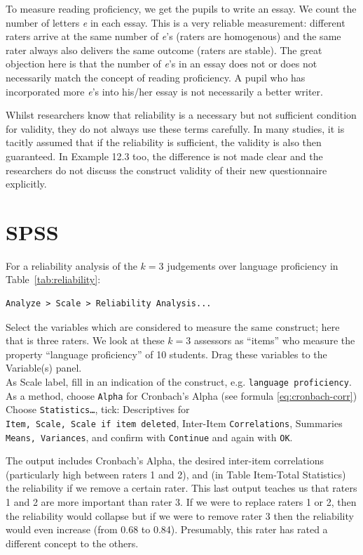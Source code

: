 \documentclass[
]{book}
\begin{document}
To measure reading proficiency, we get the pupils to write
an essay. We count the number of letters \emph{e} in each essay. This is
a very reliable measurement: different raters arrive at the same
number of \emph{e}'s (raters are homogenous) and the same rater always also
delivers the same outcome (raters are stable). The great objection here is that
the number of \emph{e}'s in an essay does not or does not necessarily match the concept
of reading proficiency. A pupil who has incorporated more \emph{e}'s into his/her essay
is not necessarily a better writer.

Whilst researchers know that reliability is a necessary but not
sufficient condition for validity, they do not always use these terms
carefully. In many studies, it is tacitly
assumed that if the reliability is sufficient, the validity
is also then guaranteed. In Example 12.3 too, the difference is not
made clear and
the researchers do not discuss the construct validity of their new
questionnaire explicitly.

\hypertarget{spss-9}{%
\section{SPSS}\label{spss-9}}

For a reliability analysis of the \(k=3\) judgements over
language proficiency in
Table~\ref{tab:reliability}:\\

\begin{verbatim}
Analyze > Scale > Reliability Analysis...
\end{verbatim}

Select the variables which are considered to measure the same construct;
here that is three raters. We look at these \(k=3\)
assessors as ``items'' who measure the property ``language proficiency'' of 10
students. Drag these variables to the Variable(s) panel.\\
As Scale label, fill in an indication of the construct, e.g.
\texttt{language\ proficiency}.\\
As a method, choose \texttt{Alpha} for Cronbach's Alpha (see formula
\eqref{eq:cronbach-corr})\\
Choose \texttt{Statistics…}, tick: Descriptives for
\texttt{Item,\ Scale,\ Scale\ if\ item\ deleted}, Inter-Item \texttt{Correlations},
Summaries \texttt{Means,\ Variances}, and confirm with \texttt{Continue} and again
with \texttt{OK}.

The output includes Cronbach's Alpha, the desired inter-item correlations
(particularly high between raters 1 and 2), and (in Table
Item-Total Statistics) the reliability if we remove a certain
rater. This last output teaches us that
raters 1 and 2 are more important than rater 3. If we
were to replace raters 1 or 2, then the reliability would collapse
but if we were to remove rater 3 then the reliability
would even increase (from 0.68 to 0.84). Presumably, this rater
has rated a different concept to the others.
\end{document}
